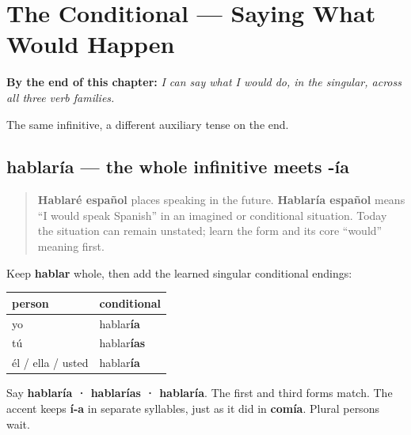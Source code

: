 
\chapter{The Conditional --- Saying What Would Happen}
\label{ch:spanish-condicional}

\begin{chapteropening}
\textbf{By the end of this chapter:} \emph{I can say what I would do, in the singular, across all three verb families.}

The same infinitive, a different auxiliary tense on the end.
\end{chapteropening}

\section[hablaría]{hablaría — the whole infinitive meets -ía}

\label{lesson:ES-C17-condicional}



\begin{quote}
\textbf{Hablaré español} places speaking in the future. \textbf{Hablaría español} means “I would speak Spanish” in an imagined or conditional situation. Today the situation can remain unstated; learn the form and its core “would” meaning first.
\end{quote}

\begin{grammarlens}[title={Grammar Lens: three familiar persons}]
Keep \textbf{hablar} whole, then add the learned singular conditional endings:

\noindent
\begin{tabularx}{\linewidth}{@{}>{\raggedright\arraybackslash}X>{\raggedright\arraybackslash}X@{}}
\toprule
\textbf{person} & \textbf{conditional} \\
\midrule
yo & hablar\textbf{ía} \\
tú & hablar\textbf{ías} \\
él / ella / usted & hablar\textbf{ía} \\
\bottomrule
\end{tabularx}

Say \textbf{hablaría · hablarías · hablaría}. The first and third forms match. The accent keeps \textbf{í-a} in separate syllables, just as it did in \textbf{comía}. Plural persons wait.
\end{grammarlens}

